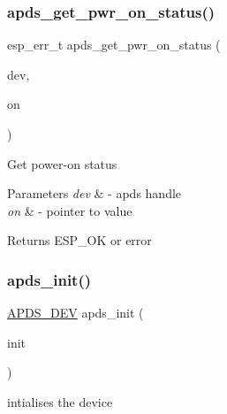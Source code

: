 \subsubsection{\texorpdfstring{apds\+\_\+get\+\_\+pwr\+\_\+on\+\_\+status()}{apds\_get\_pwr\_on\_status()}}
{\footnotesize\ttfamily esp\+\_\+err\+\_\+t apds\+\_\+get\+\_\+pwr\+\_\+on\+\_\+status (\begin{DoxyParamCaption}\item[{\hyperlink{structAPDS9960__Driver}{A\+P\+D\+S\+\_\+\+D\+EV}}]{dev,  }\item[{\hyperlink{vl53l0x__types_8h_aba7bc1797add20fe3efdf37ced1182c5}{uint8\+\_\+t} $\ast$}]{on }\end{DoxyParamCaption})}




\begin{DoxyItemize}
\item Get power-\/on status 
\end{DoxyItemize}


\begin{DoxyParams}{Parameters}
{\em dev} & -\/ apds handle \\
\hline
{\em on} & -\/ pointer to value \\
\hline
\end{DoxyParams}
\begin{DoxyReturn}{Returns}
E\+S\+P\+\_\+\+OK or error 
\end{DoxyReturn}
\mbox{\label{group__APDS9960__SetStatusFunctions_gae521c555a0b8eafc0a33f171582d0447}} 
\subsubsection{\texorpdfstring{apds\+\_\+init()}{apds\_init()}}
{\footnotesize\ttfamily \hyperlink{structAPDS9960__Driver}{A\+P\+D\+S\+\_\+\+D\+EV} apds\+\_\+init (\begin{DoxyParamCaption}\item[{\hyperlink{structapds__init__t}{apds\+\_\+init\+\_\+t} $\ast$}]{init }\end{DoxyParamCaption})}




\begin{DoxyItemize}
\item intialises the device 
\end{DoxyItemize}



